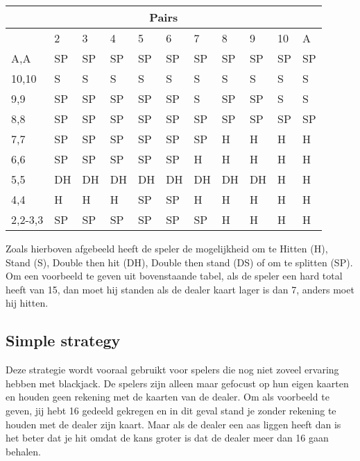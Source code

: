 \documentclass[conference]{IEEEtran}
\begin{document}
\begin{table}[ht]
\begin{tabular}{|l|l|l|l|l|l|l|l|l|l|l|}
\multicolumn{11}{|c|}{Pairs}                                                   \\ \hline
                             & 2  & 3  & 4  & 5  & 6  & 7  & 8  & 9  & 10 & A  \\ \hline
A,A                          & SP & SP & SP & SP & SP & SP & SP & SP & SP & SP \\ \hline
10,10                        & S  & S  & S  & S  & S  & S  & S  & S  & S  & S  \\ \hline
9,9                          & SP & SP & SP & SP & SP & S  & SP & SP & S  & S  \\ \hline
8,8                          & SP & SP & SP & SP & SP & SP & SP & SP & SP & SP \\ \hline
7,7                          & SP & SP & SP & SP & SP & SP & H  & H  & H  & H  \\ \hline
6,6                          & SP & SP & SP & SP & SP & H  & H  & H  & H  & H  \\ \hline
5,5                          & DH & DH & DH & DH & DH & DH & DH & DH & H  & H  \\ \hline
4,4                          & H  & H  & H  & SP & SP & H  & H  & H  & H  & H  \\ \hline
2,2-3,3                      & SP & SP & SP & SP & SP & SP & H  & H  & H  & H  \\ \hline
\end{tabular}

\end{table}

Zoals hierboven afgebeeld heeft de speler de mogelijkheid om te Hitten (H), Stand (S), Double then hit (DH), Double then stand (DS) of om te splitten (SP). Om een voorbeeld te geven uit bovenstaande tabel, als de speler een hard total heeft van 15, dan moet hij standen als de dealer kaart lager is dan 7, anders moet hij hitten.





\subsection{Simple strategy}

Deze strategie wordt vooraal gebruikt voor spelers die nog niet zoveel ervaring hebben met blackjack. De spelers zijn alleen maar gefocust op hun eigen kaarten en houden geen rekening met de kaarten van de dealer. Om als voorbeeld te geven, jij hebt 16 gedeeld gekregen en in dit geval stand je zonder rekening te houden met de dealer zijn kaart. Maar als de dealer een aas liggen heeft dan is het beter dat je hit omdat de kans groter is dat de dealer meer dan 16 gaan behalen.
\end{document}

